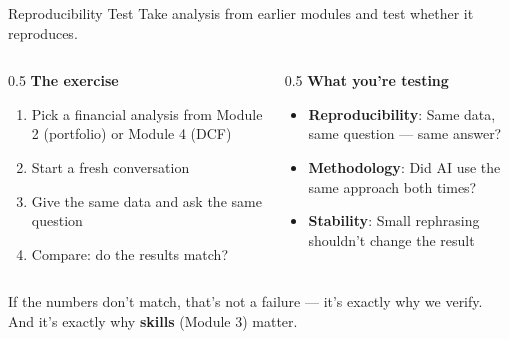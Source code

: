 \documentclass[aspectratio=169]{beamer}
\begin{document}
\begin{frame}{Reproducibility Test}
Take analysis from earlier modules and test whether it reproduces.
\vspace{0.3cm}
\begin{columns}[T]
\begin{column}{0.5\textwidth}
\textbf{The exercise}
\begin{enumerate}\small
  \item Pick a financial analysis from Module 2 (portfolio) or Module 4 (DCF)
  \item Start a \alert{fresh conversation}
  \item Give the same data and ask the same question
  \item Compare: do the results match?
\end{enumerate}
\end{column}
\begin{column}{0.5\textwidth}
\textbf{What you're testing}
\begin{itemize}\small
  \item \textbf{Reproducibility}: Same data, same question --- same answer?
  \item \textbf{Methodology}: Did AI use the same approach both times?
  \item \textbf{Stability}: Small rephrasing shouldn't change the result
\end{itemize}
\end{column}
\end{columns}
\vspace{0.3cm}
If the numbers don't match, that's not a failure --- it's \alert{exactly why we verify}. And it's exactly why \textbf{skills} (Module 3) matter.
\end{frame}
\end{document}
